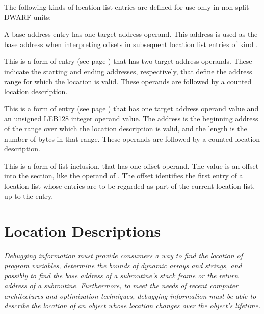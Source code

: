The following kinds of location list entries are defined for
use only in non-split DWARF units:

\begin{enumerate}[1. ]
\addtocounter{enumi}{6}
\itembfnl{\DWLLEbaseaddressTARG}
A base address entry has one target address operand.
This address is used as the base address when interpreting
offsets in subsequent location list entries of kind
\DWLLEoffsetpair.

\itembfnl{\DWLLEstartendTARG}
This is a form of  entry
\bb
(see page \pageref{text:bndlocdesc})
\eb
that has two target address operands. These indicate the
starting and ending addresses, respectively, that define
the address range for which the location is valid.
These operands are followed by a counted location description.

\itembfnl{\DWLLEstartlengthTARG}
This is a form of  entry
\bb
(see page \pageref{text:bndlocdesc})
\eb
that has one target address operand value and an unsigned LEB128
integer operand value. The address is the beginning address
of the range over which the location description is valid, and
the length is the number of bytes in that range.
These operands are followed by a counted location description.

\bb
\itembfnl{\DWLLEincludeloclistTARG}
This is a form of list inclusion, that has one offset operand.  The
value is an offset into the \dotdebugloclists{} section, like the
operand of \DWFORMsecoffset{}.  The offset identifies the
first entry of a location list whose entries are to be regarded as part of
the current location  list, up to the \DWLLEendoflist{} entry.
\eb

\end{enumerate}

\section{Location Descriptions}
\label{chap:locationdescriptions}
\textit{Debugging information
must
provide consumers a way to find
the location of program variables, determine the bounds
of dynamic arrays and strings, and possibly to find the
base address of a subroutine\textquoteright s stack frame or the return
address of a subroutine. Furthermore, to meet the needs of
recent computer architectures and optimization techniques,
debugging information must be able to describe the location of
an object whose location changes over the object\textquoteright s lifetime.}

